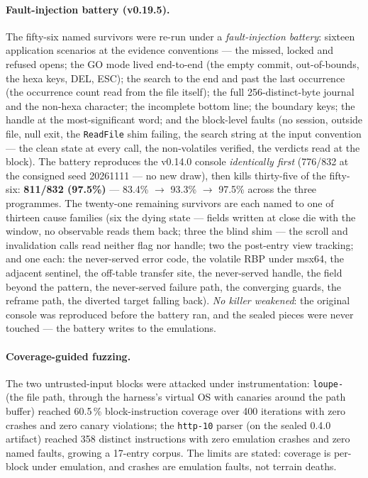 \documentclass[11pt,a4paper]{article}
\newcommand{\code}[1]{\texttt{\small #1}}
\begin{document}
\paragraph{Fault-injection battery (v0.19.5).} The fifty-six named
survivors were re-run under a \emph{fault-injection battery}: sixteen
application scenarios at the evidence conventions --- the missed,
locked and refused opens; the GO mode lived end-to-end (the empty
commit, out-of-bounds, the hexa keys, DEL, ESC); the search to the end
and past the last occurrence (the occurrence count read from the file
itself); the full 256-distinct-byte journal and the non-hexa
character; the incomplete bottom line; the boundary keys; the handle
at the most-significant word; and the block-level faults (no session,
outside file, null exit, the \code{ReadFile} shim failing, the search
string at the input convention --- the clean state at every call, the
non-volatiles verified, the verdicts read at the block). The battery
reproduces the v0.14.0 console \emph{identically first} (776/832 at
the consigned seed 20261111 --- no new draw), then kills thirty-five
of the fifty-six: \textbf{811/832 (97.5\%)} --- 83.4\% $\rightarrow$
93.3\% $\rightarrow$ 97.5\% across the three programmes. The
twenty-one remaining survivors are each named to one of thirteen cause
families (six the dying state --- fields written at close die with the
window, no observable reads them back; three the blind shim --- the
scroll and invalidation calls read neither flag nor handle; two the
post-entry view tracking; and one each: the never-served error code,
the volatile RBP under msx64, the adjacent sentinel, the off-table
transfer site, the never-served handle, the field beyond the pattern,
the never-served failure path, the converging guards, the reframe
path, the diverted target falling back). \emph{No killer weakened}:
the original console was reproduced before the battery ran, and the
sealed pieces were never touched --- the battery writes to the
emulations.

\paragraph{Coverage-guided fuzzing.} The two untrusted-input blocks were
attacked under instrumentation: \code{loupe-} (the file path, through
the harness's virtual OS with canaries around the path buffer) reached
60.5\,\% block-instruction coverage over 400 iterations with zero crashes
and zero canary violations; the \code{http-10} parser (on the sealed 0.4.0
artifact) reached 358 distinct instructions with zero emulation crashes
and zero named faults, growing a 17-entry corpus. The limits are stated:
coverage is per-block under emulation, and crashes are emulation faults,
not terrain deaths.
\end{document}
